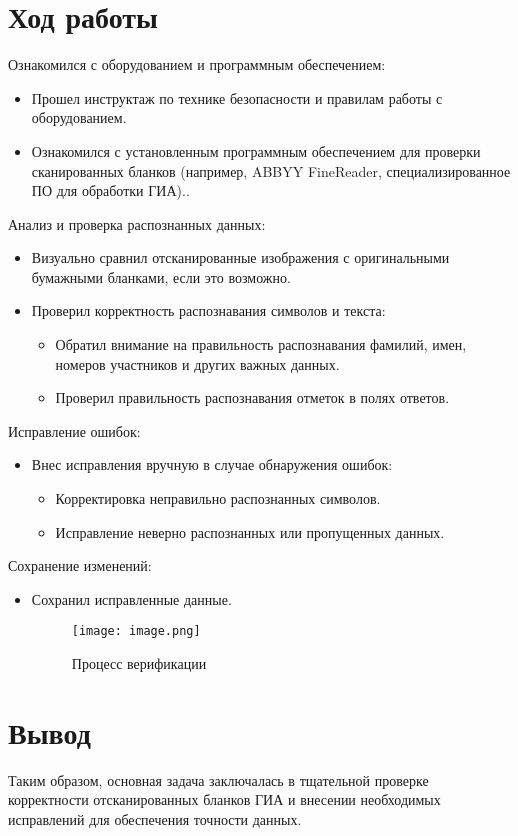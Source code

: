 \documentclass[12pt,a4paper]{scrartcl}
\begin{document}
\section{Ход работы}
\sloppy
Ознакомился с оборудованием и программным обеспечением:
\begin{itemize}
    \item Прошел инструктаж по технике безопасности и правилам работы с оборудованием. \\
    \item Ознакомился с установленным программным обеспечением для проверки сканированных бланков (например, ABBYY FineReader, специализированное ПО для обработки ГИА)..\\
\end{itemize}
Анализ и проверка распознанных данных:
\begin{itemize}
    \item Визуально сравнил отсканированные изображения с оригинальными бумажными бланками, если это возможно. \\
    \item Проверил корректность распознавания символов и текста:\\
    \begin{itemize}
    \item Обратил внимание на правильность распознавания фамилий, имен, номеров участников и других важных данных.
    \item Проверил правильность распознавания отметок в полях ответов.
    \end{itemize}
\end{itemize}
Исправление ошибок:
\begin{itemize}
    \item Внес исправления вручную в случае обнаружения ошибок:\\
    \begin{itemize}
    \item Корректировка неправильно распознанных символов.
    \item Исправление неверно распознанных или пропущенных данных.
    \end{itemize}
\end{itemize}
Сохранение изменений:
\begin{itemize}
    \item Сохранил исправленные данные.\\

\begin{figure}[h]
\centering
\texttt{[image: image.png]}
\caption{Процесс верификации}
\label{fig:mpr}
\end{figure}
\end{itemize}

\section{Вывод}
Таким образом, основная задача заключалась в тщательной проверке корректности отсканированных бланков ГИА и внесении необходимых исправлений для обеспечения точности данных.
\end{document}
